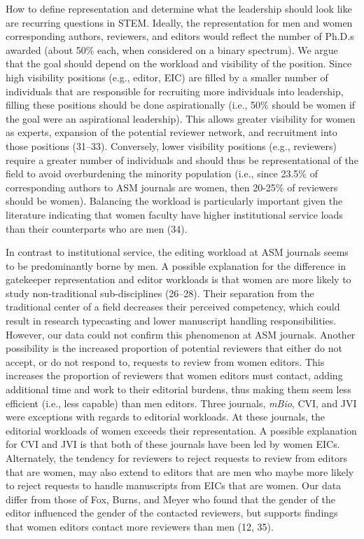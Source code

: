 \documentclass[11pt,]{article}
\begin{document}
How to define representation and determine what the leadership should
look like are recurring questions in STEM. Ideally, the representation
for men and women corresponding authors, reviewers, and editors would
reflect the number of Ph.D.s awarded (about 50\% each, when considered
on a binary spectrum). We argue that the goal should depend on the
workload and visibility of the position. Since high visibility positions
(e.g., editor, EIC) are filled by a smaller number of individuals that
are responsible for recruiting more individuals into leadership, filling
these positions should be done aspirationally (i.e., 50\% should be
women if the goal were an aspirational leadership). This allows greater
visibility for women as experts, expansion of the potential reviewer
network, and recruitment into those positions (31--33). Conversely,
lower visibility positions (e.g., reviewers) require a greater number of
individuals and should thus be representational of the field to avoid
overburdening the minority population (i.e., since 23.5\% of
corresponding authors to ASM journals are women, then 20-25\% of
reviewers should be women). Balancing the workload is particularly
important given the literature indicating that women faculty have higher
institutional service loads than their counterparts who are men (34).

In contrast to institutional service, the editing workload at ASM
journals seems to be predominantly borne by men. A possible explanation
for the difference in gatekeeper representation and editor workloads is
that women are more likely to study non-traditional sub-disciplines
(26--28). Their separation from the traditional center of a field
decreases their perceived competency, which could result in research
typecasting and lower manuscript handling responsibilities. However, our
data could not confirm this phenomenon at ASM journals. Another
possibility is the increased proportion of potential reviewers that
either do not accept, or do not respond to, requests to review from
women editors. This increases the proportion of reviewers that women
editors must contact, adding additional time and work to their editorial
burdens, thus making them seem less efficient (i.e., less capable) than
men editors. Three journals, \emph{mBio}, CVI, and JVI were exceptions
with regards to editorial workloads. At these journals, the editorial
workloads of women exceeds their representation. A possible explanation
for CVI and JVI is that both of these journals have been led by women
EICs. Alternately, the tendency for reviewers to reject requests to
review from editors that are women, may also extend to editors that are
men who maybe more likely to reject requests to handle manuscripts from
EICs that are women. Our data differ from those of Fox, Burns, and Meyer
who found that the gender of the editor influenced the gender of the
contacted reviewers, but supports findings that women editors contact
more reviewers than men (12, 35).
\end{document}
